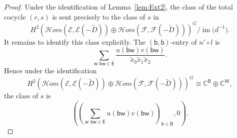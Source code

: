 \documentclass[10pt,a4paper]{amsart}
\def\B{\mathsf B}
\newcommand{\C}{{\mathbb C}}
\def\E{\mathsf E}
\def\W{\mathsf W}
\def\b{\mathsf b}
\def\cale{\mathcal E}
\def\calf{\mathcal F}
\def\w{\mathsf w}
\begin{document}
\begin{proof}
Under the identification of Lemma~\ref{lem:Ext2}, the class of the total cocycle \((r,s)\) is sent precisely to the class of \(s\) in
\[
H^2(\mathcal H om(\cale,\cale(-\widetilde D))\oplus \mathcal H om(\calf,\calf(-\widetilde D)))^G
\Big/
\operatorname{im}\bigl(d^{-1}\bigr).
\]
It remains to identify this class explicitly. The \((\b,\b)\)-entry of \(n'\circ l\) is
\[
\sum_{\w:\b\w\in \E}
\frac{u(\b\w)v(\b\w)}{\widetilde x_0\widetilde x_1\widetilde x_2}.
\]
Hence under the identification
\[
H^2(\mathcal H om(\cale,\cale(-\widetilde D))\oplus \mathcal H om(\calf,\calf(-\widetilde D)))^G
\cong \C^\B\oplus \C^\W,
\]
the class of \(s\) is
\[
\left(
\left(\sum_{\w:\b\w\in \E}u(\b\w)v(\b\w)\right)_{\b\in \B},
0
\right).
\]
\end{proof}
\end{document}
